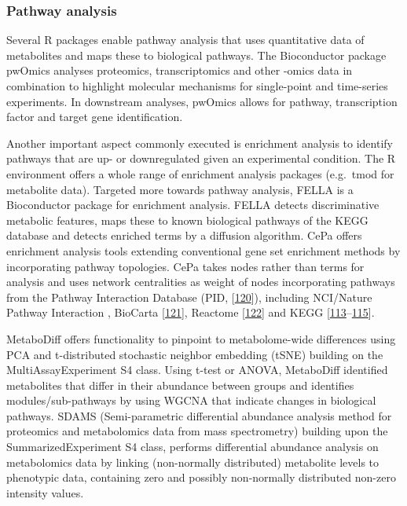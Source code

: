 \documentclass[]{article}
\begin{document}
\hypertarget{pathway-analysis}{%
\subsubsection{Pathway analysis}\label{pathway-analysis}}

Several R packages enable pathway analysis that uses quantitative data of metabolites and maps these to biological pathways. The Bioconductor package pwOmics analyses proteomics, transcriptomics and other -omics data in combination to highlight molecular mechanisms for single-point and time-series experiments. In downstream analyses, pwOmics allows for pathway, transcription factor and target gene identification.

Another important aspect commonly executed is enrichment analysis to identify pathways that are up- or downregulated given an experimental condition. The R environment offers a whole range of enrichment analysis packages (e.g.~tmod for metabolite data). Targeted more towards pathway analysis, FELLA is a Bioconductor package for enrichment analysis. FELLA detects discriminative metabolic features, maps these to known biological pathways of the KEGG database and detects enriched terms by a diffusion algorithm. CePa offers enrichment analysis tools extending conventional gene set enrichment methods by incorporating pathway topologies. CePa takes nodes rather than terms for analysis and uses network centralities as weight of nodes incorporating pathways from the Pathway Interaction Database (PID, {[}\protect\hyperlink{ref-schaefer_2009}{120}{]}), including NCI/Nature Pathway Interaction , BioCarta {[}\protect\hyperlink{ref-nishimura_2001}{121}{]}, Reactome {[}\protect\hyperlink{ref-fabregat_2018}{122}{]} and KEGG {[}\protect\hyperlink{ref-kanehisa_2017}{113}--\protect\hyperlink{ref-kanehisa_2000}{115}{]}.

MetaboDiff offers functionality to pinpoint to metabolome-wide differences using PCA and t-distributed stochastic neighbor embedding (tSNE) building on the MultiAssayExperiment S4 class. Using t-test or ANOVA, MetaboDiff identified metabolites that differ in their abundance between groups and identifies modules/sub-pathways by using WGCNA that indicate changes in biological pathways. SDAMS (Semi-parametric differential abundance analysis method for proteomics and metabolomics data from mass spectrometry) building upon the SummarizedExperiment S4 class, performs differential abundance analysis on metabolomics data by linking (non-normally distributed) metabolite levels to phenotypic data, containing zero and possibly non-normally distributed non-zero intensity values.
\end{document}

